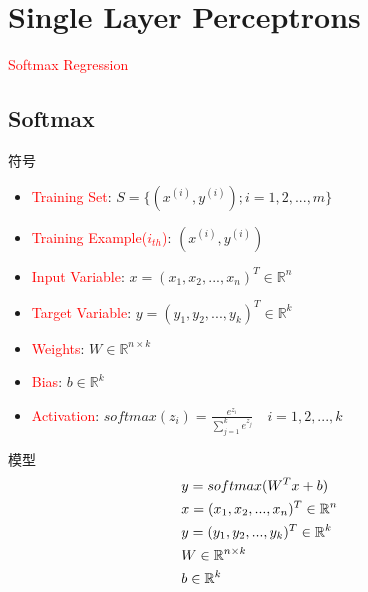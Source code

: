 \section{Single Layer Perceptrons}
\label{sec:slp}

\begin{frame}
  \begin{center}
    \Huge{\textcolor{red}{Softmax Regression}}
  \end{center}
\end{frame}

\subsection{Softmax}

\begin{frame}[fragile]{符号}
 \begin{itemize}
   \item \textcolor{red}{Training Set}: $ S = \{ ({x^{(i)}},{y^{(i)}});i = 1,2,...,m\} $
   \item \textcolor{red}{Training Example($i_{th}$)}: $ ({x^{(i)}},{y^{(i)}}) $
   \item \textcolor{red}{Input Variable}: $ x = ({x_1},{x_2},...,{x_n})^{T}  \in {\mathbb{R}^n} $
   \item \textcolor{red}{Target Variable}: $ y = ({y_1},{y_2},...,{y_k})^{T} \in {\mathbb{R}^k} $
   \item \textcolor{red}{Weights}: $ W \in {\mathbb{R}^{n \times k}} $   
   \item \textcolor{red}{Bias}: $ b \in {\mathbb{R}^k} $   
   \item \textcolor{red}{Activation}: $ 
softmax {(z_i)} = \tfrac{{{e^{{z_i}}}}}{{\sum\limits_{j = 1}^k {{e^{{z_j}}}} }}  \quad i = 1,2,...,k
$   
 \end{itemize}
\end{frame}


\begin{frame}{模型}
\[\begin{gathered}
  y = softmax ({W^T}x + b) \hfill \\
  x = {({x_1},{x_2},...,{x_n})^T} \in {\mathbb{R}^n} \hfill \\
  y = {({y_1},{y_2},...,{y_k})^T} \in {\mathbb{R}^k} \hfill \\
  W \in {\mathbb{R}^{n \times k}} \hfill \\
  b \in {\mathbb{R}^k} \hfill \\ 
\end{gathered} \]
\end{frame}

